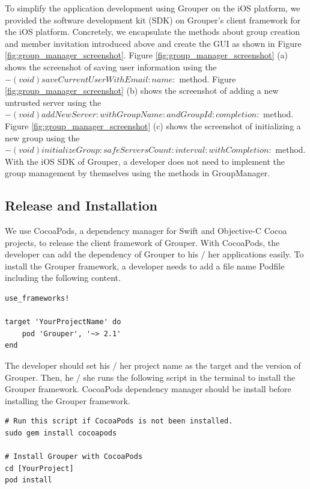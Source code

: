 \documentclass[a4paper,11pt]{report}
\begin{document}
To simplify the application development using Grouper on the iOS platform, we provided the software development kit (SDK) on Grouper's client framework for the iOS platform.
Concretely, we encapsulate the methods about group creation and member invitation introduced above and create the GUI as shown in Figure \ref{fig:group_manager_screenshot}.
Figure \ref{fig:group_manager_screenshot} (a) shows the screenshot of saving user information using the  $- (void)saveCurrentUserWithEmail:name:$ method.
Figure \ref{fig:group_manager_screenshot} (b) shows the screenshot of adding a new untrusted server using the  $- (void)addNewServer:withGroupName:andGroupId:completion:$ method.
Figure \ref{fig:group_manager_screenshot} (c) shows the screenshot of initializing a new group using the  $- (void)initializeGroup:safeServersCount:interval:withCompletion:$ method.
With the iOS SDK of Grouper, a developer does not need to implement the group management by themselves using the methods in GroupManager. 

\subsection{Release and Installation}

We use CocoaPods\cite{cocoapods}, a dependency manager for Swift and Objective-C Cocoa projects, to release the client framework of Grouper.
With CocoaPods, the developer can add the dependency of Grouper to his / her applications easily.
To install the Grouper framework, a developer needs to add a file name Podfile including the following content.

\begin{lstlisting}[frame=none language=Ruby] 
use_frameworks!

target 'YourProjectName' do
    pod 'Grouper', '~> 2.1'
end
\end{lstlisting}

The developer should set his / her project name as the target and the version of Grouper.
Then, he / she runs the following script in the terminal to install the Grouper framework.
CocoaPods dependency manager should be install before installing the Grouper framework.

\begin{lstlisting}[frame=none language=shell] 
# Run this script if CocoaPods is not been installed.
sudo gem install cocoapods

# Install Grouper with CocoaPods
cd [YourProject]
pod install
\end{lstlisting}
\end{document}
